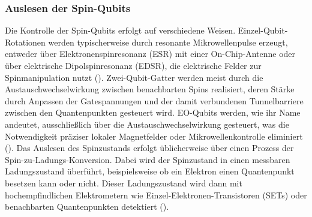 \subsubsection{Auslesen der Spin-Qubits}
Die Kontrolle der Spin-Qubits erfolgt auf verschiedene Weisen. Einzel-Qubit-Rotationen werden typischerweise durch resonante Mikrowellenpulse erzeugt, entweder über Elektronenspinresonanz (ESR) mit einer On-Chip-Antenne oder über elektrische Dipolspinresonanz (EDSR), die elektrische Felder zur Spinmanipulation nutzt (\cite{stuyckCMOSCompatibilitySemiconductor2024}). Zwei-Qubit-Gatter werden meist durch die Austauschwechselwirkung zwischen benachbarten Spins realisiert, deren Stärke durch Anpassen der Gatespannungen und der damit verbundenen Tunnelbarriere zwischen den Quantenpunkten gesteuert wird. EO-Qubits werden, wie ihr Name andeutet, ausschließlich über die Austauschwechselwirkung gesteuert, was die Notwendigkeit präziser lokaler Magnetfelder oder Mikrowellenkontrolle eliminiert (\cite{chadwickShortTwoqubitPulse2025}).
Das Auslesen des Spinzustands erfolgt üblicherweise über einen Prozess der Spin-zu-Ladungs-Konversion. Dabei wird der Spinzustand in einen messbaren Ladungszustand überführt, beispielsweise ob ein Elektron einen Quantenpunkt besetzen kann oder nicht. Dieser Ladungszustand wird dann mit hochempfindlichen Elektrometern wie Einzel-Elektronen-Transistoren (SETs) oder benachbarten Quantenpunkten detektiert (\cite{stuyckCMOSCompatibilitySemiconductor2024}).

